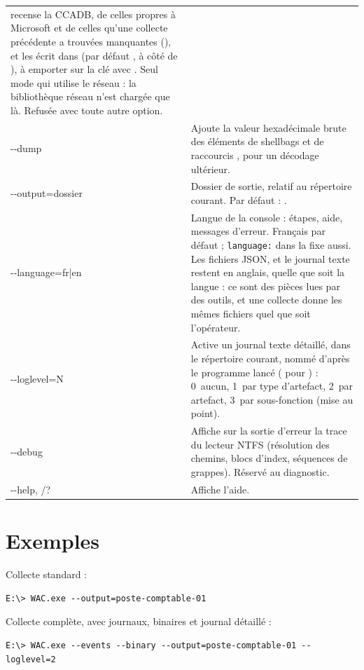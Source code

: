 \documentclass[11pt,a4paper,oneside]{report}
\begin{document}
\begin{longtable}{@{}>{\ttfamily}L{3.2cm}L{11.2cm}@{}}
  recense la CCADB, de celles propres à Microsoft et de celles qu'une collecte
  précédente a trouvées manquantes (), et les écrit dans  (par
  défaut , à côté de ), à emporter sur la clé
  avec . Seul mode qui utilise le réseau : la bibliothèque
  réseau n'est chargée que là. Refusée avec toute autre option. \\
-{}-dump & Ajoute la valeur hexadécimale brute des éléments de shellbags et de
  raccourcis , pour un décodage ultérieur. \\
-{}-output=dossier & Dossier de sortie, relatif au répertoire courant. Par défaut :
  . \\
-{}-language=fr|en & Langue de la console : étapes, aide, messages d'erreur.
  Français par défaut ; \texttt{language:} dans  la fixe
  aussi. Les fichiers JSON,  et le journal texte
  restent en anglais, quelle que soit la langue : ce sont des pièces lues par
  des outils, et une collecte donne les mêmes fichiers quel que soit
  l'opérateur. \\
-{}-loglevel=N & Active un journal texte détaillé, dans le répertoire courant,
  nommé d'après le programme lancé ( pour ) : 0~aucun, 1~par type
  d'artefact, 2~par artefact, 3~par sous-fonction (mise au point). \\
-{}-debug & Affiche sur la sortie d'erreur la trace du lecteur NTFS (résolution
  des chemins, blocs d'index, séquences de grappes). Réservé au diagnostic. \\
-{}-help, /? & Affiche l'aide. \\
\bottomrule
\end{longtable}

\section{Exemples}

Collecte standard :
\begin{lstlisting}
E:\> WAC.exe --output=poste-comptable-01
\end{lstlisting}

Collecte complète, avec journaux, binaires et journal détaillé :
\begin{lstlisting}
E:\> WAC.exe --events --binary --output=poste-comptable-01 --loglevel=2
\end{lstlisting}
\end{document}
